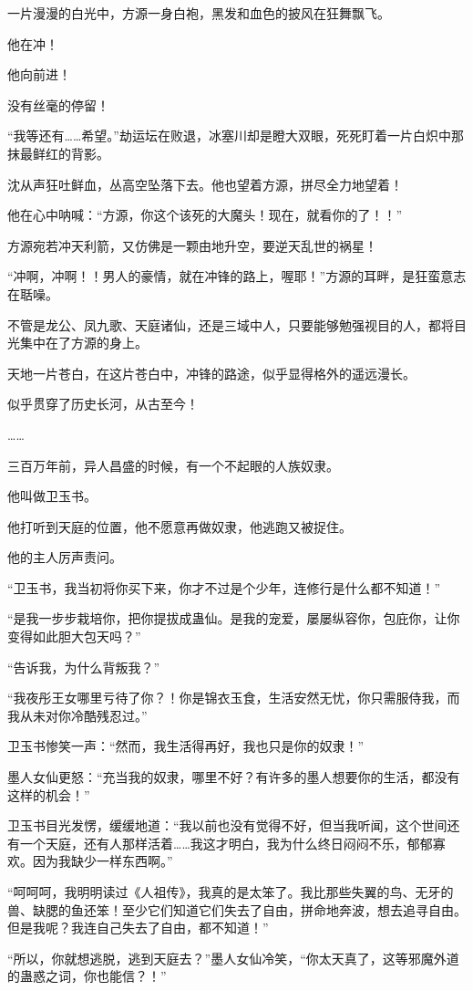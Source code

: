 \begin{this_body}
一片漫漫的白光中，方源一身白袍，黑发和血色的披风在狂舞飘飞。

他在冲！

他向前进！

没有丝毫的停留！

“我等还有……希望。”劫运坛在败退，冰塞川却是瞪大双眼，死死盯着一片白炽中那抹最鲜红的背影。

沈从声狂吐鲜血，丛高空坠落下去。他也望着方源，拼尽全力地望着！

他在心中呐喊：“方源，你这个该死的大魔头！现在，就看你的了！！”

方源宛若冲天利箭，又仿佛是一颗由地升空，要逆天乱世的祸星！

“冲啊，冲啊！！男人的豪情，就在冲锋的路上，喔耶！”方源的耳畔，是狂蛮意志在聒噪。

不管是龙公、凤九歌、天庭诸仙，还是三域中人，只要能够勉强视目的人，都将目光集中在了方源的身上。

天地一片苍白，在这片苍白中，冲锋的路途，似乎显得格外的遥远漫长。

似乎贯穿了历史长河，从古至今！

……

三百万年前，异人昌盛的时候，有一个不起眼的人族奴隶。

他叫做卫玉书。

他打听到天庭的位置，他不愿意再做奴隶，他逃跑又被捉住。

他的主人厉声责问。

“卫玉书，我当初将你买下来，你才不过是个少年，连修行是什么都不知道！”

“是我一步步栽培你，把你提拔成蛊仙。是我的宠爱，屡屡纵容你，包庇你，让你变得如此胆大包天吗？”

“告诉我，为什么背叛我？”

“我夜彤王女哪里亏待了你？！你是锦衣玉食，生活安然无忧，你只需服侍我，而我从未对你冷酷残忍过。”

卫玉书惨笑一声：“然而，我生活得再好，我也只是你的奴隶！”

墨人女仙更怒：“充当我的奴隶，哪里不好？有许多的墨人想要你的生活，都没有这样的机会！”

卫玉书目光发愣，缓缓地道：“我以前也没有觉得不好，但当我听闻，这个世间还有一个天庭，还有人那样活着……我这才明白，我为什么终日闷闷不乐，郁郁寡欢。因为我缺少一样东西啊。”

“呵呵呵，我明明读过《人祖传》，我真的是太笨了。我比那些失翼的鸟、无牙的兽、缺腮的鱼还笨！至少它们知道它们失去了自由，拼命地奔波，想去追寻自由。但是我呢？我连自己失去了自由，都不知道！”

“所以，你就想逃脱，逃到天庭去？”墨人女仙冷笑，“你太天真了，这等邪魔外道的蛊惑之词，你也能信？！”


\end{this_body}
